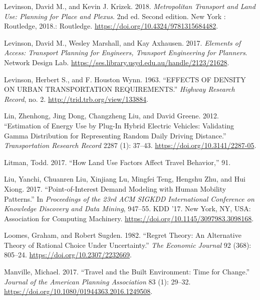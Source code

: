 \documentclass[
  12pt,
]{article}
\newlength{\cslhangindent}
\newlength{\cslentryspacingunit} %
\newenvironment{CSLReferences}[2] %
 {%
  \setlength{\parindent}{0pt}
  \ifodd #1
  \let\oldpar\par
  \def\par{\hangindent=\cslhangindent\oldpar}
  \fi
  \setlength{\parskip}{#2\cslentryspacingunit}
 }%
 {}
\begin{document}
\begin{CSLReferences}{1}{0}
\leavevmode{}%
Levinson, David M., and Kevin J. Krizek. 2018. \emph{Metropolitan {Transport} and {Land Use}: {Planning} for {Place} and {Plexus}}. 2nd ed. {Second edition. \textbar{} New York : Routledge, 2018.}: {Routledge}. \url{https://doi.org/10.4324/9781315684482}.

\leavevmode{}%
Levinson, David M., Wesley Marshall, and Kay Axhausen. 2017. \emph{Elements of {Access}: {Transport Planning} for {Engineers}, {Transport Engineering} for {Planners}}. {Network Design Lab}. \url{https://ses.library.usyd.edu.au/handle/2123/21628}.

\leavevmode{}%
Levinson, Herbert S., and F. Houston Wynn. 1963. {``{EFFECTS OF DENSITY ON URBAN TRANSPORTATION REQUIREMENTS}.''} \emph{Highway Research Record}, no. 2. \url{http://trid.trb.org/view/133884}.

\leavevmode{}%
Lin, Zhenhong, Jing Dong, Changzheng Liu, and David Greene. 2012. {``Estimation of {Energy Use} by {Plug-In Hybrid Electric Vehicles}: {Validating Gamma Distribution} for {Representing Random Daily Driving Distance}.''} \emph{Transportation Research Record} 2287 (1): 37--43. \url{https://doi.org/10.3141/2287-05}.

\leavevmode{}%
Litman, Todd. 2017. {``How {Land Use Factors Affect Travel Behavior},''} 91.

\leavevmode{}%
Liu, Yanchi, Chuanren Liu, Xinjiang Lu, Mingfei Teng, Hengshu Zhu, and Hui Xiong. 2017. {``Point-of-{Interest Demand Modeling} with {Human Mobility Patterns}.''} In \emph{Proceedings of the 23rd {ACM SIGKDD International Conference} on {Knowledge Discovery} and {Data Mining}}, 947--55. {KDD} '17. {New York, NY, USA}: {Association for Computing Machinery}. \url{https://doi.org/10.1145/3097983.3098168}.

\leavevmode{}%
Loomes, Graham, and Robert Sugden. 1982. {``Regret {Theory}: {An Alternative Theory} of {Rational Choice Under Uncertainty}.''} \emph{The Economic Journal} 92 (368): 805--24. \url{https://doi.org/10.2307/2232669}.

\leavevmode{}%
Manville, Michael. 2017. {``Travel and the {Built Environment}: {Time} for {Change}.''} \emph{Journal of the American Planning Association} 83 (1): 29--32. \url{https://doi.org/10.1080/01944363.2016.1249508}.


\end{CSLReferences}
\end{document}
